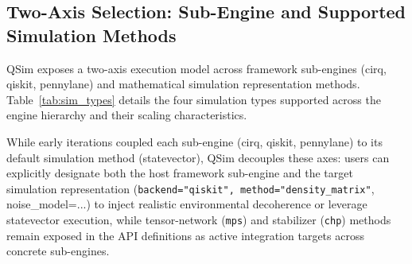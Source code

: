 \documentclass[runningheads]{llncs}
\begin{document}
\subsection{Two-Axis Selection: Sub-Engine and Supported Simulation Methods}

QSim exposes a two-axis execution model across framework sub-engines (cirq, qiskit, pennylane) and mathematical simulation representation methods. Table~\ref{tab:sim_types} details the four simulation types supported across the engine hierarchy and their scaling characteristics.

\begin{table}[htbp]
\centering
\caption{Supported simulation types in QSim across framework sub-engines and their computational characteristics.}
\label{tab:sim_types}
\renewcommand{\arraystretch}{1.25}
\setlength{\tabcolsep}{8pt}
\end{table}

While early iterations coupled each sub-engine (cirq, qiskit, pennylane) to its default simulation method (statevector), QSim decouples these axes: users can explicitly designate both the host framework sub-engine and the target simulation representation (\texttt{backend="qiskit", method="density\_matrix"}, noise\_model=...) to inject realistic environmental decoherence or leverage statevector execution, while tensor-network (\texttt{mps}) and stabilizer (\texttt{chp}) methods remain exposed in the API definitions as active integration targets across concrete sub-engines.
\end{document}
